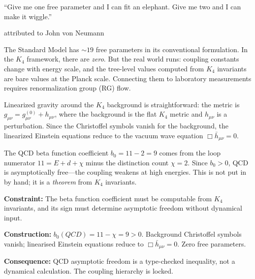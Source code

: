 \documentclass[11pt,a4paper]{book}
\def\mathrm#1{#1}%
\begin{document}
\epigraph{``Give me one free parameter and I can fit an elephant. Give me two and I can make it wiggle.''}{attributed to John von Neumann}

The Standard Model has $\sim 19$ free parameters in its conventional formulation. In the $K_4$ framework, there are \emph{zero}. But the real world runs: coupling constants change with energy scale, and the tree-level values computed from $K_4$ invariants are bare values at the Planck scale. Connecting them to laboratory measurements requires renormalization group (RG) flow.

Linearized gravity around the $K_4$ background is straightforward: the metric is $g_{\mu\nu} = g^{(0)}_{\mu\nu} + h_{\mu\nu}$, where the background is the flat $K_4$ metric and $h_{\mu\nu}$ is a perturbation. Since the Christoffel symbols vanish for the background, the linearized Einstein equations reduce to the vacuum wave equation $\Box \bar{h}_{\mu\nu} = 0$.

The QCD beta function coefficient $b_0 = 11 - 2 = 9$ comes from the loop numerator $11 = E + d + \chi$ minus the distinction count $\chi = 2$. Since $b_0 > 0$, QCD is asymptotically free---the coupling weakens at high energies. This is not put in by hand; it is a \emph{theorem} from $K_4$ invariants.

\textbf{Constraint:} The beta function coefficient must be computable from $K_4$ invariants, and its sign must determine asymptotic freedom without dynamical input.

\textbf{Construction:} $b_0(\mathrm{QCD}) = 11 - \chi = 9 > 0$. Background Christoffel symbols vanish; linearised Einstein equations reduce to $\Box\bar{h}_{\mu\nu} = 0$. Zero free parameters.

\textbf{Consequence:} QCD asymptotic freedom is a type-checked inequality, not a dynamical calculation. The coupling hierarchy is locked.
\end{document}
